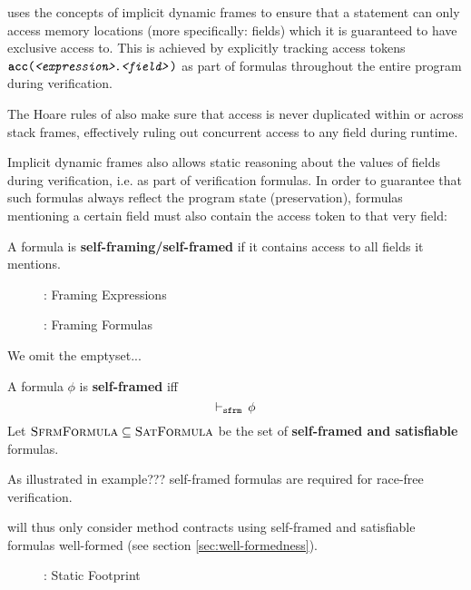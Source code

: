 


\svl uses the concepts of implicit dynamic frames to ensure that a statement can only access memory locations (more specifically: fields) which it is guaranteed to have exclusive access to.
This is achieved by explicitly tracking access tokens $\textup{\texttt{\textbf{acc}(\textit{<expression>}.\textit{<field>})}}$ as part of formulas throughout the entire program during verification.
    
The Hoare rules of \svl also make sure that access is never duplicated within or across stack frames, effectively ruling out concurrent access to any field during runtime.

Implicit dynamic frames also allows static reasoning about the values of fields during verification, i.e. as part of verification formulas.
In order to guarantee that such formulas always reflect the program state (preservation), formulas mentioning a certain field must also contain the access token to that very field:
\begin{definition}
    A formula is \textbf{self-framing/self-framed} if it contains access to all fields it mentions.
\end{definition}


\begin{figure}
    
    \caption{\svlidf: Framing Expressions}
\end{figure}

\begin{figure}
    
    \caption{\svlidf: Framing Formulas}
\end{figure}

We omit the emptyset... 

\begin{definition}
    A formula $\phi$ is \textbf{self-framed} iff
    \begin{displaymath}
    \vdash_\texttt{sfrm}\, \phi
    \end{displaymath}
    Let $\textup{\textsc{SfrmFormula}} \subseteq \textup{\textsc{SatFormula}}$ be the set of \textbf{self-framed and satisfiable} formulas.
\end{definition}

As illustrated in example??? self-framed formulas are required for race-free verification.

\svl will thus only consider method contracts using self-framed and satisfiable formulas well-formed (see section \ref{sec:well-formedness}).

\begin{figure}
    
    \caption{\svlidf: Static Footprint}
\end{figure}

